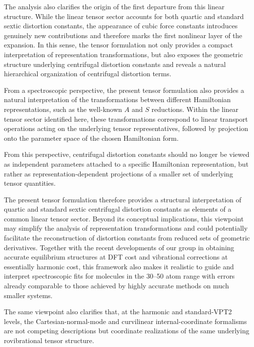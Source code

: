 The analysis also clarifies the origin of the first departure from
this linear structure. While the linear tensor sector accounts for
both quartic and standard sextic distortion constants, the appearance
of cubic force constants introduces genuinely new contributions and
therefore marks the first nonlinear layer of the expansion. In this
sense, the tensor formulation not only provides a compact
interpretation of representation transformations, but also exposes the
geometric structure underlying centrifugal distortion constants and
reveals a natural hierarchical organization of centrifugal distortion
terms.

From a spectroscopic perspective, the present tensor formulation also
provides a natural interpretation of the transformations between
different Hamiltonian representations, such as the well-known $A$ and
$S$ reductions. Within the linear tensor sector identified here, these
transformations correspond to linear transport operations acting on the
underlying tensor representatives, followed by projection onto the
parameter space of the chosen Hamiltonian form.

From this perspective, centrifugal distortion constants should no
longer be viewed as independent parameters attached to a specific
Hamiltonian representation, but rather as representation-dependent
projections of a smaller set of underlying tensor quantities.

The present tensor formulation therefore provides a structural
interpretation of quartic and standard sextic centrifugal distortion
constants as elements of a common linear tensor sector. Beyond its
conceptual implications, this viewpoint may simplify the analysis of
representation transformations and could potentially facilitate the
reconstruction of distortion constants from reduced sets of geometric
derivatives. Together with the recent developments of our group in
obtaining accurate equilibrium structures at DFT cost and vibrational
corrections at essentially harmonic cost, this framework also makes it
realistic to guide and interpret spectroscopic fits for molecules in the
30--50 atom range with errors already comparable to those achieved by
highly accurate methods on much smaller systems.

The same viewpoint also clarifies that, at the harmonic and
standard-VPT2 levels, the Cartesian-normal-mode and curvilinear
internal-coordinate formalisms are not competing descriptions but
coordinate realizations of the same underlying rovibrational tensor
structure.

